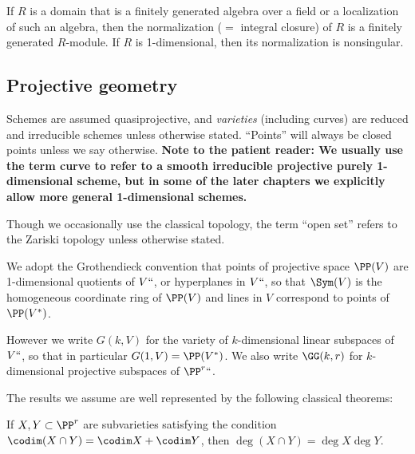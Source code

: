 \begin{theorem}\label{finiteness of normalization}
 If $R$ is a domain that is a finitely generated algebra over a field or a localization of such an algebra, then the
normalization ($=$ integral closure) of $R$ is a finitely generated $R$-module.
If $R$ is 1-dimensional, then its normalization is nonsingular.
\end{theorem}

\subsection*{Projective geometry}
 
Schemes 
are assumed 
quasiprojective,
%
%
and \emph{varieties} (including
curves) are 
reduced and irreducible schemes
unless otherwise stated.
%
%
``Points''
will always be closed points unless we say otherwise. 
{\bf Note to the patient reader: We usually use the term curve to refer to a smooth irreducible projective purely 1-dimensional scheme, but in some of the later chapters we explicitly allow more general 1-dimensional schemes.}

Though we occasionally use the classical topology, 
the term ``open set'' refers to the 
Zariski topology
unless otherwise stated.
%

We adopt the 
Grothendieck convention
that points of projective space 
%
%
%
%
%
$\PP(V)$ are 1-dimensional quotients of $V` `$, or hyperplanes in $V` `$, so that
$\Sym(V)$ is the homogeneous coordinate ring of $\PP(V)$ and lines in $V$ correspond to points of $\PP(V^*)$.
%

However we write $G(k,V)$ for the variety of $k$-dimensional linear subspaces of $V` `$, so that in particular $G(1,V) = \PP(V^*)$.
We also write $\GG(k,r)$ for $k$-dimen\-sional
projective subspaces of $\PP^r` `$.

The results we assume are
 well represented by the following classical theorems:

\begin{theorem}
If $X,Y\subset \PP^r$ are subvarieties 
satisfying the condition
$\codim(X\cap Y) = \codim X + \codim Y$,
then $\deg (X\cap Y) = \deg X\deg Y$.%
%
\end{theorem}


